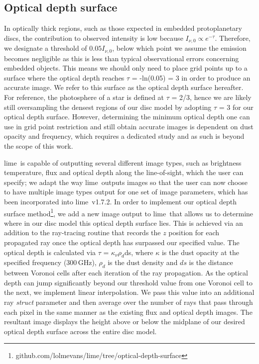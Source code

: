 \documentclass[fleqn,usenatbib]{mnras}
\newcommand{\lime}{{\sc lime}}
\begin{document}
\subsection{Optical depth surface}
\label{sec:tausurface}

In optically thick regions, such as those expected in embedded protoplanetary discs, the contribution to observed intensity is low because $I_{\nu,0} \propto e^{-{\tau}}$. Therefore, we designate a threshold of $0.05I_{\nu,0}$, below which point we assume the emission becomes negligible as this is less than typical observational errors concerning embedded objects. This means we should only need to place grid points up to a surface where the optical depth reaches $\tau$ = -ln(0.05) = 3 in order to produce an accurate image. We refer to this surface as the optical depth surface hereafter. For reference, the photosphere of a star is defined at $\tau$ = 2/3, hence we are likely still oversampling the densest regions of our disc model by adopting $\tau$ = 3 for our optical depth surface. However, determining the minimum optical depth one can use in grid point restriction and still obtain accurate images is dependent on dust opacity and frequency, which requires a dedicated study and as such is beyond the scope of this work.

\smallskip

\lime\ is capable of outputting several different image types, such as brightness temperature, flux and optical depth along the line-of-sight, which the user can specify; we adapt the way \lime\ outputs images so that the user can now choose to have multiple image types output for one set of image parameters, which has been incorporated into \lime\ v1.7.2. In order to implement our optical depth surface method\footnote{github.com/lolmevans/lime/tree/optical-depth-surface}, we add a new image output to \lime\ that allows us to determine where in our disc model this optical depth surface lies. This is achieved via an addition to the ray-tracing routine that records the $z$ position for each propagated ray once the optical depth has surpassed our specified value. The optical depth is calculated via $\tau$ = $\kappa_{\nu}\rho_d$ds, where $\kappa$ is the dust opacity at the specified frequency (300\,GHz), $\rho_d$ is the dust density and $ds$ is the distance between Voronoi cells after each iteration of the ray propagation. As the optical depth can jump significantly beyond our threshold value from one Voronoi cell to the next, we implement linear interpolation. We pass this value into an additional ray \textit{struct} parameter and then average over the number of rays that pass through each pixel in the same manner as the existing flux and optical depth images. The resultant image displays the height above or below the midplane of our desired optical depth surface across the entire disc model.
\end{document}
